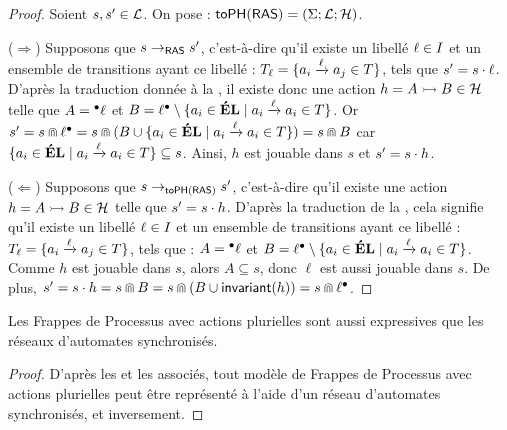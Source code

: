 \begin{proof}
  Soient $s, s' \in \mathcal{L}$.
  On pose : $\mathsf{toPH}(\mathsf{RAS}) = (\Sigma; \mathcal{L}; \mathcal{H})$.
  
  ($\Rightarrow$) Supposons que $s \rightarrow_{\mathsf{RAS}} s'$,
    c'est-à-dire qu'il existe un libellé $\ell \in I$ et un ensemble de transitions
    ayant ce libellé : $T_\ell = \{ a_i \xrightarrow{\ell} a_j \in T \}$,
    tels que $s' = s \cdot \ell$.
    D'après la traduction donnée à la , il existe donc une action
    $h = \mbox{$A \rightarrowtail B$} \in \mathcal{H}$ telle que $A = {}^\bullet \ell$ et
    $B = \ell {}^\bullet \setminus \{ a_i \in \mathbf{\acute{E}L} \mid a_i \xrightarrow{\ell} a_i \in T \}$.
    Or $s' = s \Cap \ell {}^\bullet
      = s \Cap (B \cup \{ a_i \in \mathbf{\acute{E}L} \mid a_i \xrightarrow{\ell} a_i \in T \})
      = s \Cap B$
    car $\{ a_i \in \mathbf{\acute{E}L} \mid a_i \xrightarrow{\ell} a_i \in T \} \subseteq s$.
    Ainsi, $h$ est jouable dans $s$ et $s' = s \cdot h$.
  
  ($\Leftarrow$) Supposons que $s \rightarrow_{\mathsf{toPH}(\mathsf{RAS})} s'$,
    c'est-à-dire qu'il existe une action $h = \mbox{$A \rightarrowtail B$} \in \mathcal{H}$
    telle que $s' = s \cdot h$.
    D'après la traduction de la ,
    cela signifie qu'il existe un libellé $\ell \in I$ et un ensemble de transitions
    ayant ce libellé : $T_\ell = \{ a_i \xrightarrow{\ell} a_j \in T \}$,
    tels que : $A = {}^\bullet \ell$ et
    $B = \ell {}^\bullet \setminus \{ a_i \in \mathbf{\acute{E}L} \mid a_i \xrightarrow{\ell} a_i \in T \}$.
    Comme $h$ est jouable dans $s$, alors $A \subseteq s$, donc $\ell$ est aussi jouable dans $s$.
    De plus, $s' = s \cdot h = s \Cap B = s \Cap (B \cup \mathsf{invariant}(h))
      = s \Cap \ell {}^\bullet$.
\end{proof}

\begin{theorem}
  Les Frappes de Processus avec actions plurielles sont aussi expressives
  que les réseaux d'automates synchronisés.
\end{theorem}

\begin{proof}
  D'après les  et les 
  associés, tout modèle de Frappes de Processus avec actions plurielles peut être représenté
  à l'aide d'un réseau d'automates synchronisés, et inversement.
\end{proof}

